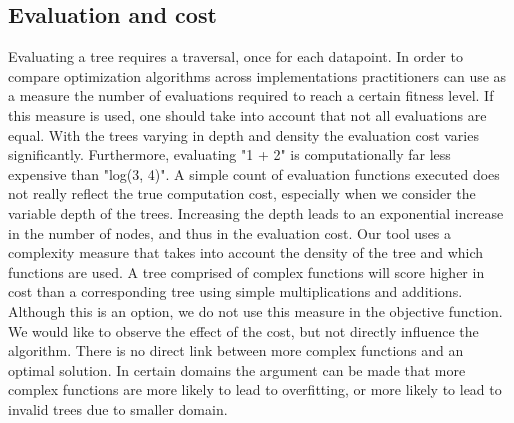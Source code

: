 \subsection{Evaluation and cost}
Evaluating a tree requires a traversal, once for each datapoint. In order to compare optimization algorithms across implementations practitioners can use as a measure the number of evaluations required to reach a certain fitness level. If this measure is used, one should take into account that not all evaluations are equal. With the trees varying in depth and density the evaluation cost varies significantly. Furthermore, evaluating "1 + 2" is computationally far less expensive than "log(3, 4)". A simple count of evaluation functions executed does not really reflect the true computation cost, especially when we consider the variable depth of the trees. Increasing the depth leads to an exponential increase in the number of nodes, and thus in the evaluation cost.
Our tool uses a complexity measure that takes into account the density of the tree and which functions are used. A tree comprised of complex functions will score higher in cost than a corresponding tree using simple multiplications and additions. Although this is an option, we do not use this measure in the objective function. We would like to observe the effect of the cost, but not directly influence the algorithm. There is no direct link between more complex functions and an optimal solution. In certain domains the argument can be made that more complex functions are more likely to lead to overfitting, or more likely to lead to invalid trees due to smaller domain.


